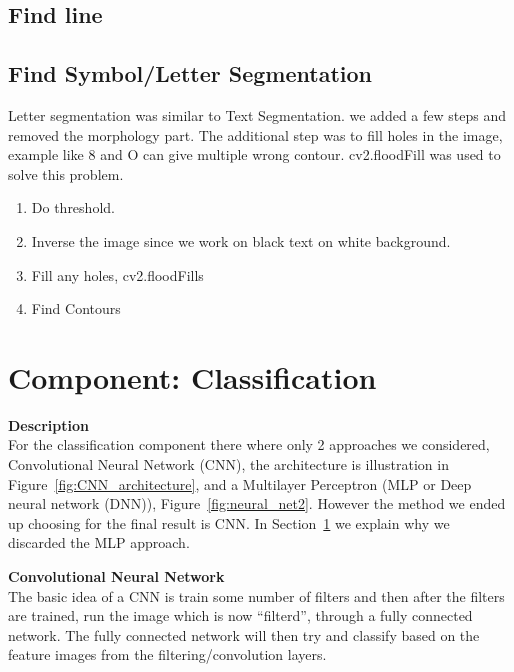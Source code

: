 \documentclass[Report.tex]{subfiles}
\begin{document}
\subsection{Find line}\label{subsec:Find_line}


\subsection{Find Symbol/Letter Segmentation}\label{subsec:Find_Symb}
Letter segmentation was similar to Text Segmentation. we added a few steps and removed the morphology part. The additional step was to fill holes in the image, example like 8 and O can give multiple wrong contour. cv2.floodFill was used to solve this problem.
\begin{enumerate}
  \item Do threshold.
  \item Inverse the image since we work on black text on white background.
  \item Fill any holes, cv2.floodFills
  \item Find Contours
\end{enumerate}


\section{Component: Classification}
\label{Method:Classification}
\begin{flushleft}
  \textbf{Description} \\
  For the classification component there where only 2 approaches we considered,
  Convolutional Neural Network (CNN), the architecture is illustration in
  Figure~\ref{fig:CNN_architecture}, and a Multilayer Perceptron (MLP or Deep
  neural network (DNN)), Figure~\ref{fig:neural_net2}. However the method we ended up choosing for the final result is CNN. In
  Section~\ref{Method:Classification} we explain why we discarded
  the MLP approach. \par
\end{flushleft}

\begin{flushleft}
  \textbf{Convolutional Neural Network} \\
  The basic idea of a CNN is train some number of filters and then
  after the filters are trained, run the image which is now ``filterd'', through
  a fully connected network. The fully connected network will then try and
  classify based on the feature images from the filtering/convolution layers. \par
\end{flushleft}
\end{document}
